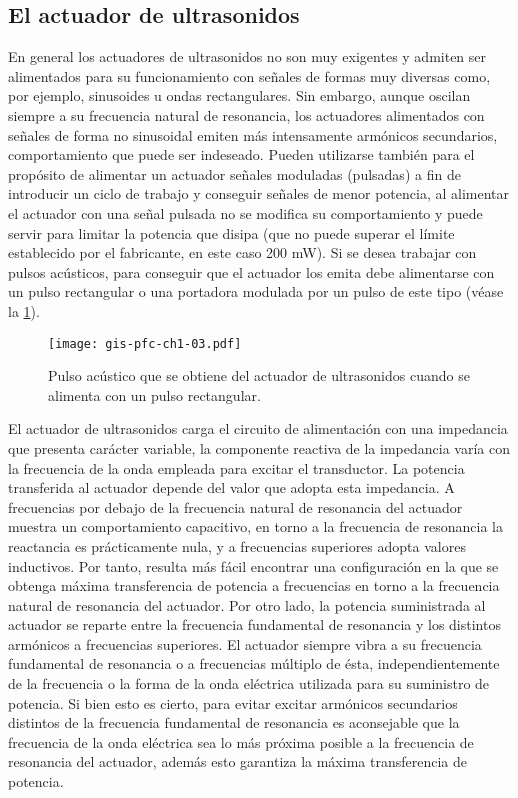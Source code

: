\subsection{El actuador de ultrasonidos}

En general los actuadores de ultrasonidos no son muy exigentes y admiten
ser alimentados para su funcionamiento con señales de formas muy diversas
como, por ejemplo, sinusoides u ondas rectangulares. Sin embargo, aunque
oscilan siempre a su frecuencia natural de resonancia, los actuadores
alimentados con señales de forma no sinusoidal emiten más intensamente
armónicos secundarios, comportamiento que puede ser indeseado. Pueden
utilizarse también para el propósito de alimentar un actuador señales
moduladas (pulsadas) a fin de introducir un ciclo de trabajo y conseguir
señales de menor potencia, al alimentar el actuador con una señal pulsada
no se modifica su comportamiento y puede servir para limitar la potencia
que disipa (que no puede superar el límite establecido por el fabricante,
en este caso 200 mW). Si se desea trabajar con pulsos acústicos, para
conseguir que el actuador los emita debe alimentarse con un pulso
rectangular o una portadora modulada por un pulso de este tipo (véase la
\cref{fig:pulse}).

\sshortpage{}

\begin{figure}
	\begin{center}
		\texttt{[image: gis-pfc-ch1-03.pdf]}
	\end{center}
	\caption[Pulso acústico generado por el actuador de
	ultrasonidos]{Pulso acústico que se obtiene del actuador de
	ultrasonidos cuando se alimenta con un pulso rectangular.}
	\label{fig:pulse}
\end{figure}

El actuador de ultrasonidos carga el circuito de alimentación con una
impedancia que presenta carácter variable, la componente reactiva de la
impedancia varía con la frecuencia de la onda empleada para excitar el
transductor. La potencia transferida al actuador depende del valor que
adopta esta impedancia. A frecuencias por debajo de la frecuencia natural
de resonancia del actuador muestra un comportamiento capacitivo, en torno a
la frecuencia de resonancia la reactancia es prácticamente nula, y a
frecuencias superiores adopta valores inductivos. Por tanto, resulta más
fácil encontrar una configuración en la que se obtenga máxima transferencia
de potencia a frecuencias en torno a la frecuencia natural de resonancia
del actuador. Por otro lado, la potencia suministrada al actuador se
reparte entre la frecuencia fundamental de resonancia y los distintos
armónicos a frecuencias superiores. El actuador siempre vibra a su
frecuencia fundamental de resonancia o a frecuencias múltiplo de ésta,
independientemente de la frecuencia o la forma de la onda eléctrica
utilizada para su suministro de potencia. Si bien esto es cierto, para
evitar excitar armónicos secundarios distintos de la frecuencia fundamental
de resonancia es aconsejable que la frecuencia de la onda eléctrica sea lo
más próxima posible a la frecuencia de resonancia del actuador, además esto
garantiza la máxima transferencia de potencia.

